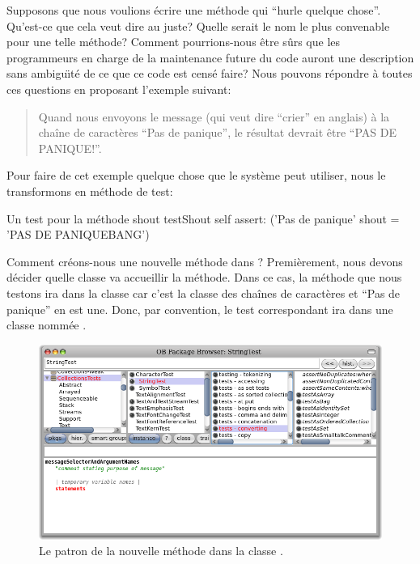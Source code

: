 \documentclass[a4paper,10pt,twoside]{book}
\begin{document}
Supposons que nous voulions écrire une méthode qui ``hurle quelque
chose''. Qu'est-ce que cela veut dire au juste? Quelle serait le nom
le plus convenable pour une telle méthode? Comment pourrions-nous
être sûrs que les programmeurs en charge de la maintenance future
du code auront une description sans ambigu\"{\i}té de ce que ce code
est censé faire?
Nous pouvons répondre à toutes ces questions en proposant
l'exemple suivant:

\begin{quote}
Quand nous envoyons le message  (qui veut dire ``crier'' en anglais)
à la chaîne de caractères ``Pas de panique'', le résultat
devrait être ``PAS DE PANIQUE!''.
\end{quote}

\noindent
Pour faire de cet exemple quelque chose que le système peut
utiliser, nous le transformons en méthode de test:

\begin{method}[testShout]{Un test pour la méthode shout}
testShout
	self assert: ('Pas de panique' shout = 'PAS DE PANIQUEBANG')
\end{method} %

Comment créons-nous une nouvelle méthode dans \pharo? Premièrement,
nous devons décider quelle classe va accueillir la méthode.
Dans ce cas, la méthode  que nous testons ira dans la
classe 
car c'est la classe des chaînes de caractères et ``Pas de panique'' en est une.
Donc, par convention, le test correspondant ira dans une classe
nommée .

\begin{figure}[hbt]
	{\centerline {\includegraphics[width=\textwidth]{StringTest-newMethodTemplate}}}
\caption{Le patron de la nouvelle méthode dans la classe .
}
\end{figure}
\end{document}
